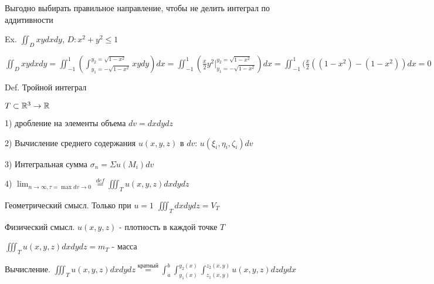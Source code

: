 \documentclass[12pt]{article}
\begin{document}
    Выгодно выбирать правильное направление, чтобы не делить интеграл по аддитивности

    Ex. $\iint_D xy dx dy$, $D : x^2 + y^2 \leq 1$

    $\iint_D xy dx dy = \iint_{-1}^1 (\int_{y_1 = -\sqrt{1-x^2}}^{y_2 = \sqrt{1-x^2}} xy dy) dx = \iint_{-1}^1 (\frac{x}{2} y^2 \Big|_{y_1 = -\sqrt{1-x^2}}^{y_2 = \sqrt{1-x^2}}) dx =
    \iint_{-1}^1 (\frac{x}{2} ((1 - x^2) - (1 - x^2)) dx = 0$

    Def. Тройной интеграл

    $T \subset \mathbb{R}^3 \rightarrow \mathbb{R}$

    1) дробление на элементы объема $dv = dxdydz$

    2) Вычисление среднего содержания $u(x, y, z)$ в $dv$: $u(\xi_i, \eta_i, \zeta_i) dv$

    3) Интегральная сумма $\sigma_n = \Sigma u(M_i) dv$

    4) $\lim_{n \to \infty, \tau = \max dv \to 0} \stackrel{def}{=} \iiint_T u(x, y, z) dxdydz$

    Геометрический смысл. Только при $u = 1$ $\iiint_T dxdydz = V_T$

    Физический смысл. $u(x, y, z)$ - плотность в каждой точке $T$

    $\iiint_T u(x, y, z) dxdydz = m_T$ - масса

    Вычисление. $\iiint_T u(x, y, z) dxdydz \stackrel{\text{кратный}}{=} \int^b_a \int_{y_1(x)}^{y_2(x)} \int_{z_1(x, y)}^{z_2(x, y)} u(x, y, z) dz dy dx$
\end{document}
